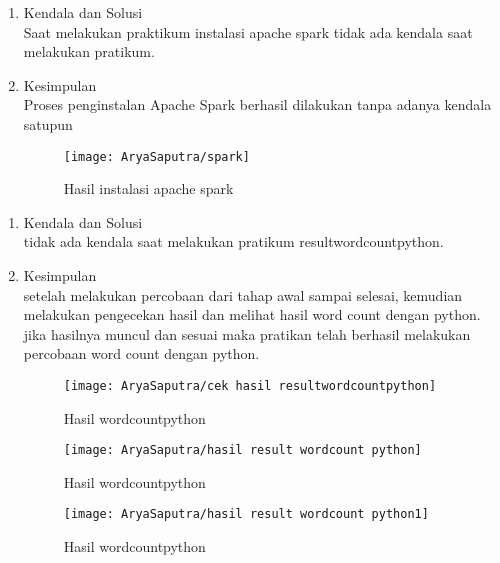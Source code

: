 \clearpage
{}
\begin{enumerate}
\item Kendala dan Solusi \\
Saat melakukan praktikum instalasi apache spark tidak ada kendala saat melakukan pratikum.

\item Kesimpulan \\
Proses penginstalan Apache Spark berhasil dilakukan tanpa adanya kendala satupun

\begin{figure}[!ht]
\texttt{[image: AryaSaputra/spark]}
\caption{Hasil instalasi apache spark}
\label{gam:instalasi apache spark}
\end{figure}
\end{enumerate}


\clearpage
{}
\begin{enumerate}
\item Kendala dan Solusi \\
tidak ada kendala saat melakukan pratikum resultwordcountpython.

\item Kesimpulan \\
setelah melakukan percobaan dari tahap awal sampai selesai, kemudian melakukan pengecekan hasil dan melihat hasil word count dengan python. jika hasilnya muncul dan sesuai maka pratikan telah berhasil melakukan percobaan word count dengan python.

\begin{figure}[!ht]
\texttt{[image: AryaSaputra/cek hasil resultwordcountpython]}
\caption{Hasil wordcountpython}
\label{gam:wordcountpython}
\end{figure}

\vspace*{-1cm}
\begin{figure}[!ht]
\texttt{[image: AryaSaputra/hasil result wordcount python]}
\caption{Hasil wordcountpython}
\label{gam:wordcountpython}
\end{figure}

\vspace*{-.5cm}
\begin{figure}[!ht]
\texttt{[image: AryaSaputra/hasil result wordcount python1]}
\caption{Hasil wordcountpython}
\label{gam:wordcountpython}
\end{figure}
\end{enumerate}

